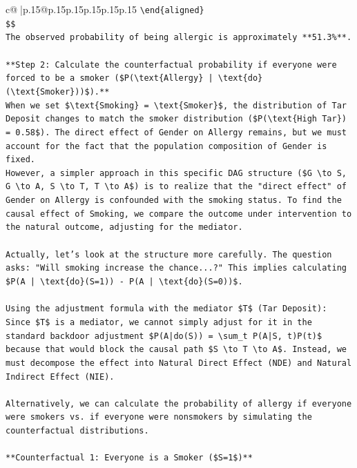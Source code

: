 \documentclass{article}
\begin{document}
{\begin{supertabular}{c@{$\;$}|p{.15\linewidth}@{}p{.15\linewidth}p{.15\linewidth}p{.15\linewidth}p{.15\linewidth}p{.15\linewidth}}
{{{\texttt{\textbackslash{}end\{aligned\}} \\
\texttt{\$\$} \\
\texttt{The observed probability of being allergic is approximately **51.3\%**.} \\
\\ 
\texttt{**Step 2: Calculate the counterfactual probability if everyone were forced to be a smoker (\$P(\textbackslash{}text\{Allergy\} | \textbackslash{}text\{do\}(\textbackslash{}text\{Smoker\}))\$).**} \\
\texttt{When we set \$\textbackslash{}text\{Smoking\} = \textbackslash{}text\{Smoker\}\$, the distribution of Tar Deposit changes to match the smoker distribution (\$P(\textbackslash{}text\{High Tar\}) = 0.58\$). The direct effect of Gender on Allergy remains, but we must account for the fact that the population composition of Gender is fixed.} \\
\texttt{However, a simpler approach in this specific DAG structure (\$G \textbackslash{}to S, G \textbackslash{}to A, S \textbackslash{}to T, T \textbackslash{}to A\$) is to realize that the "direct effect" of Gender on Allergy is confounded with the smoking status. To find the causal effect of Smoking, we compare the outcome under intervention to the natural outcome, adjusting for the mediator.} \\
\\ 
\texttt{Actually, let's look at the structure more carefully. The question asks: "Will smoking increase the chance...?" This implies calculating \$P(A | \textbackslash{}text\{do\}(S=1)) {-} P(A | \textbackslash{}text\{do\}(S=0))\$.} \\
\\ 
\texttt{Using the adjustment formula with the mediator \$T\$ (Tar Deposit):} \\
\texttt{Since \$T\$ is a mediator, we cannot simply adjust for it in the standard backdoor adjustment \$P(A|do(S)) = \textbackslash{}sum\_t P(A|S, t)P(t)\$ because that would block the causal path \$S \textbackslash{}to T \textbackslash{}to A\$. Instead, we must decompose the effect into Natural Direct Effect (NDE) and Natural Indirect Effect (NIE).} \\
\\ 
\texttt{Alternatively, we can calculate the probability of allergy if everyone were smokers vs. if everyone were nonsmokers by simulating the counterfactual distributions.} \\
\\ 
\texttt{**Counterfactual 1: Everyone is a Smoker (\$S=1\$)**} \\
}}}
\end{supertabular}}
\end{document}
